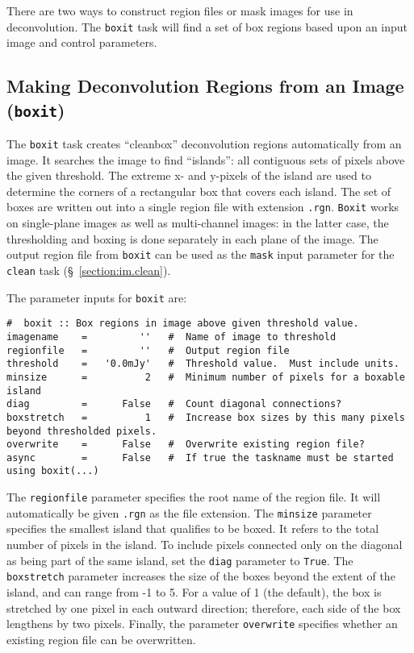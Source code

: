 There are two ways to construct region files or mask images for use
in deconvolution.  The {\tt boxit} task will find a set of box regions
based upon an input image and control parameters.  

\subsection{Making Deconvolution Regions from an Image ({\tt boxit})}
\label{section:im.mask.boxit}

The {\tt boxit} task creates ``cleanbox'' deconvolution regions automatically
from an image.  It searches the image to find ``islands'': all contiguous
sets of pixels above the given threshold.  The extreme x- and y-pixels of the
island are used to determine the corners of a rectangular box that covers each
island.  The set of boxes are written out into a single region file with
extension {\tt .rgn}.  {\tt Boxit} works on single-plane images as well as
multi-channel images: in the latter case, the thresholding and boxing is done
separately in each plane of the image.  The output region file from {\tt boxit}
can be used as the {\tt mask} input parameter for the {\tt clean} task
(\S~\ref{section:im.clean}).

The parameter inputs for {\tt boxit} are:
\small
\begin{verbatim}
#  boxit :: Box regions in image above given threshold value.
imagename    =         ''   #  Name of image to threshold
regionfile   =         ''   #  Output region file
threshold    =   '0.0mJy'   #  Threshold value.  Must include units.
minsize      =          2   #  Minimum number of pixels for a boxable island
diag         =      False   #  Count diagonal connections?
boxstretch   =          1   #  Increase box sizes by this many pixels beyond thresholded pixels.
overwrite    =      False   #  Overwrite existing region file?
async        =      False   #  If true the taskname must be started using boxit(...)
\end{verbatim}
\normalsize 

The {\tt regionfile} parameter specifies the root name of the region file.  It
will automatically be given {\tt .rgn} as the file extension.  
The {\tt minsize} parameter specifies the smallest island that qualifies to be
boxed.  It refers to the total number of pixels in the island. 
To include pixels connected only on the diagonal as being part of the same
island, set the {\tt diag} parameter to {\tt True}.  The {\tt boxstretch}
parameter increases the size of the boxes beyond the extent of the island, and
can range from -1 to 5.  For a value of 1 (the default), the
box is stretched by one pixel in each outward direction; therefore, each side
of the box lengthens by two pixels.  Finally, the parameter {\tt overwrite}
specifies whether an existing region file can be overwritten.


